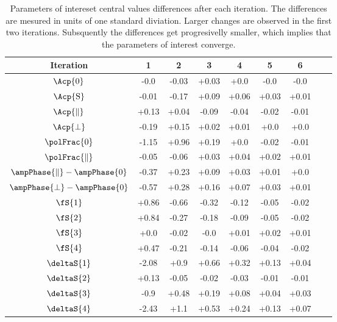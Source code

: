 \begin{table}[!h]
\centering
\footnotesize
\begin{tabular}{ c c c c c c c c c }
  \hline
  Iteration          &       1       &       2       &       3       &       4       &       5       &       6 \\  
  \hline
  $\Acp{0}$                           &  -0.0   &  -0.03  &  +0.03  &  +0.0   &  -0.0   &  -0.0    \\  
  $\Acp{\text{S}}$                    &  -0.01  &  -0.17  &  +0.09  &  +0.06  &  +0.03  &  +0.01   \\  
  $\Acp{\parallel}$                   &  +0.13  &  +0.04  &  -0.09  &  -0.04  &  -0.02  &  -0.01   \\  
  $\Acp{\perp}$                       &  -0.19  &  +0.15  &  +0.02  &  +0.01  &  +0.0   &  +0.0    \\  
  $\polFrac{0}$                       &  -1.15  &  +0.96  &  +0.19  &  +0.0   &  -0.02  &  -0.01   \\  
  $\polFrac{\parallel}$               &  -0.05  &  -0.06  &  +0.03  &  +0.04  &  +0.02  &  +0.01   \\  
  $\ampPhase{\parallel}-\ampPhase{0}$ &  -0.37  &  +0.23  &  +0.09  &  +0.03  &  +0.01  &  +0.0    \\  
  $\ampPhase{\perp}-\ampPhase{0}$     &  -0.57  &  +0.28  &  +0.16  &  +0.07  &  +0.03  &  +0.01   \\  
  $\fS{1}$                            &  +0.86  &  -0.66  &  -0.32  &  -0.12  &  -0.05  &  -0.02   \\  
  $\fS{2}$                            &  +0.84  &  -0.27  &  -0.18  &  -0.09  &  -0.05  &  -0.02   \\  
  $\fS{3}$                            &  +0.0   &  -0.02  &  -0.0   &  +0.01  &  +0.02  &  +0.01   \\  
  $\fS{4}$                            &  +0.47  &  -0.21  &  -0.14  &  -0.06  &  -0.04  &  -0.02   \\  
  $\deltaS{1}$                        &  -2.08  &  +0.9   &  +0.66  &  +0.32  &  +0.13  &  +0.04   \\  
  $\deltaS{2}$                        &  +0.13  &  -0.05  &  -0.02  &  -0.03  &  -0.01  &  -0.01   \\  
  $\deltaS{3}$                        &  -0.9   &  +0.48  &  +0.19  &  +0.08  &  +0.04  &  +0.03   \\  
  $\deltaS{4}$                        &  -2.43  &  +1.1   &  +0.53  &  +0.24  &  +0.13  &  +0.07   \\  
  \hline
\end{tabular}
\caption{Parameters of intereset central values differences after each iteration. The differences are mesured in units of one
         standard diviation. Larger changes are observed in the first two iterations. Subsquently the differences get progresivelly
         smaller, which implies that the parameters of interest converge.}
\label{pars_convergence}
\end{table}

